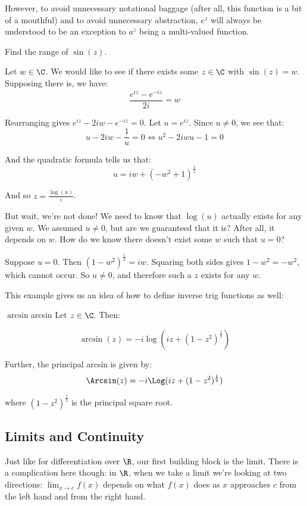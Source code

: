 However, to avoid unnecessary notational baggage (after all, this function is a bit of a mouthful) and to avoid unnecessary abstraction, $e^z$ will always be understood to be an exception to $a^z$ being a multi-valued function.

\begin{ex}{}{} Find the range of $\sin(z)$.

Let $w\in \C$. We would like to see if there exists some $z\in\C$ with $\sin(z) = w$. Supposing there is, we have:
$$\frac{e^{iz} - e^{-iz}}{2i} = w$$

Rearranging gives $e^{iz} - 2iw - e^{-iz} = 0$. Let $u = e^{iz}$. Since $u\ne 0$, we see that:
$$u - 2iw - \frac{1}{u} = 0 \iff u^2 - 2iwu - 1 = 0$$

And the quadratic formula tells us that:
$$u = iw + (-w^2 + 1)^{\frac{1}{2}}$$

And so $z = \frac{\log(u)}{i}$.

But wait, we're not done! We need to know that $\log(u)$ actually exists for any given $w$. We assumed $u\ne 0$, but are we guaranteed that it is? After all, it depends on $w$. How do we know there doesn't exist some $w$ such that $u = 0$?

Suppose $u = 0$. Then $(1 - w^2)^{\frac{1}{2}} = iw$. Squaring both sides gives $1 - w^2 = -w^2$, which cannot occur. So $u\ne 0$, and therefore such a $z$ exists for any $w$.
\end{ex}

This example gives us an idea of how to define inverse trig functions as well:

\begin{defbo}{$\arcsin$}{arcsin} Let $z\in \C$. Then:

$$\arcsin(z) = -i\log(iz + (1 - z^2)^{\frac{1}{2}})$$

Further, the principal arcsin is given by:
$$\Arcsin(z) = -i\Log(iz + (1-z^2)^{\frac{1}{2}})$$

\noin where $(1 - z^2)^{\frac{1}{2}}$ is the principal square root.
\end{defbo}

\subsection{Limits and Continuity}

Just like for differentiation over $\R$, our first building block is the limit. There is a complication here though: in $\R$, when we take a limit we're looking at two directions: $\lim_{x\rightarrow c} f(x)$ depends on what $f(x)$ does as $x$ approaches $c$ from the left hand and from the right hand.

